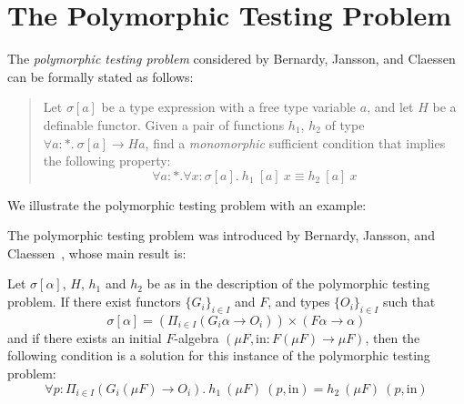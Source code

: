 \documentclass{llncs}
\begin{document}
\section{The Polymorphic Testing Problem}

The {\em polymorphic testing problem} considered by Bernardy, Jansson,
and Claessen can be formally stated as follows:

\begin{verse}\label{problem:poly-testing}
  \hspace*{0.2in}Let $\sigma[a]$ be a type expression with a free
  type variable $a$, and let $H$ be a definable functor. Given a
  pair of functions $h_1$, $h_2$ of type $\forall a :
  *.~\sigma[a] \to H a$, find a \emph{monomorphic} sufficient
  condition that implies the following property:
  \begin{equation}
    \label{eq:problem}
    \forall a : *. \forall x : \sigma[a].~h_1~[a]~x \equiv h_2~[a]~x
  \end{equation}
\end{verse}

\begin{example}
  We illustrate the polymorphic testing problem with an example:

\end{example}

The polymorphic testing problem was introduced by Bernardy, Jansson,
and Claessen~\cite{bjc10}, whose main result is:

\begin{theorem}\label{thm:poly-testing}
Let $\sigma[\alpha]$, $H$, $h_1$ and $h_2$ be as in the description of
the polymorphic testing problem. If there exist functors $\{G_i\}_{i
  \in I}$ and $F$, and types $\{O_i\}_{i \in I}$ such that
\begin{displaymath}
  \sigma[\alpha] = \left( \Pi_{i \in I} (G_i \alpha \to O_i)\right) 
  \times  (F \alpha \to \alpha)
\end{displaymath}
and if there exists an initial $F$-algebra $(\mu F, \mathrm{in} : F(\mu
F) \to \mu F)$, then the following condition is a solution for this
instance of the polymorphic testing problem:
\begin{equation}
  \label{eq:solution-pt}
  \forall p : \Pi_{i \in I}(G_i(\mu F) \to O_i).~h_1~(\mu F)~(p,
  \mathrm{in}) = h_2~(\mu F)~(p, \mathrm{in})
\end{equation}
\end{theorem}
\end{document}
